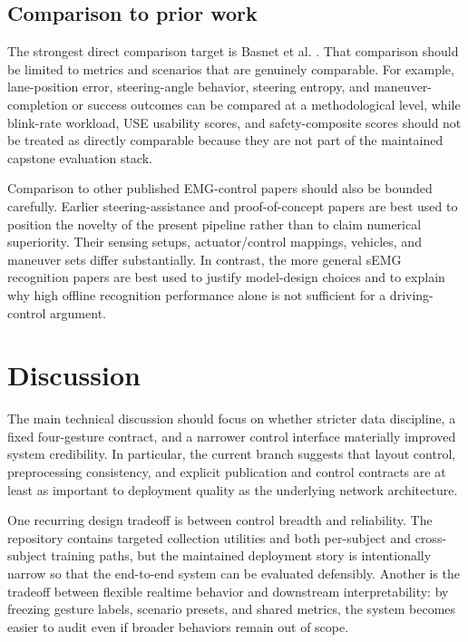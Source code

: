 \documentclass[11pt]{article}
\begin{document}
\subsection{Comparison to prior work}
The strongest direct comparison target is Basnet et al. \cite{basnet2026}. That comparison should be limited to metrics and scenarios that are genuinely comparable. For example, lane-position error, steering-angle behavior, steering entropy, and maneuver-completion or success outcomes can be compared at a methodological level, while blink-rate workload, USE usability scores, and safety-composite scores should not be treated as directly comparable because they are not part of the maintained capstone evaluation stack.

Comparison to other published EMG-control papers should also be bounded carefully. Earlier steering-assistance and proof-of-concept papers \cite{gomezgil2011,nacpil2019,nacpil2020,defreitas2019} are best used to position the novelty of the present pipeline rather than to claim numerical superiority. Their sensing setups, actuator/control mappings, vehicles, and maneuver sets differ substantially. In contrast, the more general sEMG recognition papers \cite{chen2020,shin2024} are best used to justify model-design choices and to explain why high offline recognition performance alone is not sufficient for a driving-control argument.

\section{Discussion}
The main technical discussion should focus on whether stricter data discipline, a fixed four-gesture contract, and a narrower control interface materially improved system credibility. In particular, the current branch suggests that layout control, preprocessing consistency, and explicit publication and control contracts are at least as important to deployment quality as the underlying network architecture.

One recurring design tradeoff is between control breadth and reliability. The repository contains targeted collection utilities and both per-subject and cross-subject training paths, but the maintained deployment story is intentionally narrow so that the end-to-end system can be evaluated defensibly. Another is the tradeoff between flexible realtime behavior and downstream interpretability: by freezing gesture labels, scenario presets, and shared metrics, the system becomes easier to audit even if broader behaviors remain out of scope.
\end{document}
